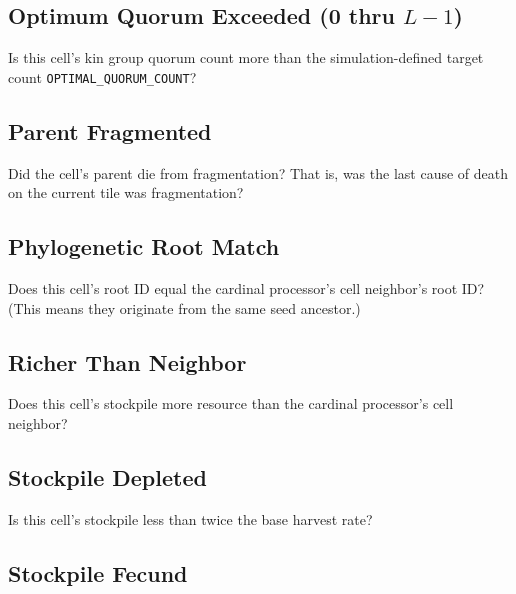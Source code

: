\subsection{Optimum Quorum Exceeded (0 thru $L-1$)}


Is this cell's kin group quorum count more than the simulation-defined target count \texttt{OPTIMAL\_QUORUM\_COUNT}?

\subsection{Parent Fragmented}


Did the cell's parent die from fragmentation?
That is, was the last cause of death on the current tile was fragmentation?

\subsection{Phylogenetic Root Match}


Does this cell's root ID equal the cardinal processor's cell neighbor's root ID?
(This means they originate from the same seed ancestor.)

\subsection{Richer Than Neighbor}


Does this cell's stockpile more resource than the cardinal processor's cell neighbor?

\subsection{Stockpile Depleted}


Is this cell's stockpile less than twice the base harvest rate?

\subsection{Stockpile Fecund}

